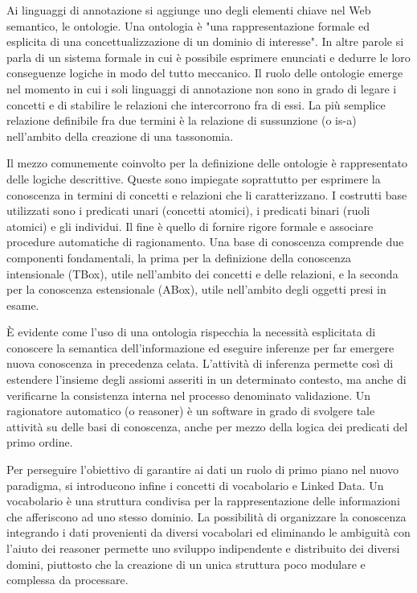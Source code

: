 \documentclass[Lau,binding=0.6cm,noexaminfo,oneside]{sapthesis}
\begin{document}
Ai linguaggi di annotazione si aggiunge uno degli elementi chiave nel Web semantico, le ontologie. Una ontologia è "una rappresentazione formale ed esplicita di una concettualizzazione di un dominio di interesse"\cite{sem_web}. In altre parole si parla di un sistema formale in cui è possibile esprimere enunciati e dedurre le loro conseguenze logiche in modo del tutto meccanico.
Il ruolo delle ontologie emerge nel momento in cui i soli linguaggi di annotazione non sono in grado di legare i concetti e di stabilire le relazioni che intercorrono fra di essi. La più semplice relazione definibile fra due termini è la relazione di sussunzione (o is-a) nell'ambito della creazione di una tassonomia.\medskip

Il mezzo comunemente coinvolto per la definizione delle ontologie è rappresentato delle logiche descrittive. Queste sono impiegate soprattutto per esprimere la conoscenza in termini di concetti e relazioni che li caratterizzano. I costrutti base utilizzati sono i predicati unari (concetti atomici), i predicati binari (ruoli atomici) e gli individui.
Il fine è quello di fornire rigore formale e associare procedure automatiche di ragionamento. Una base di conoscenza comprende due componenti fondamentali, la prima per la definizione della conoscenza intensionale (TBox), utile nell'ambito dei concetti e delle relazioni, e la seconda per la conoscenza estensionale (ABox), utile nell'ambito degli oggetti presi in esame.\medskip

\MakeUppercase{è} evidente come l'uso di una ontologia rispecchia la necessità esplicitata di conoscere la semantica dell'informazione ed eseguire inferenze per far emergere nuova conoscenza in precedenza celata.
L'attività di inferenza permette così di estendere l'insieme degli assiomi asseriti in un determinato contesto, ma anche di verificarne la consistenza interna nel processo denominato validazione. Un ragionatore automatico (o reasoner) è un software in grado di svolgere tale attività su delle basi di conoscenza, anche per mezzo della logica dei predicati del primo ordine.\medskip

Per perseguire l'obiettivo di garantire ai dati un ruolo di primo piano nel nuovo paradigma, si introducono infine i concetti di vocabolario e Linked Data. Un vocabolario è una struttura condivisa per la rappresentazione delle informazioni che afferiscono ad uno stesso dominio.
La possibilità di organizzare la conoscenza integrando i dati provenienti da diversi vocabolari ed eliminando le ambiguità con l'aiuto dei reasoner permette uno sviluppo indipendente e distribuito dei diversi domini, piuttosto che la creazione di un unica struttura poco modulare e complessa da processare.\medskip
\end{document}

